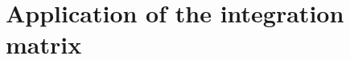 \documentclass{sfuthesis}
\begin{document}

\section{Application of the integration matrix}
\label{sec:PSIMappl}
\end{document}
